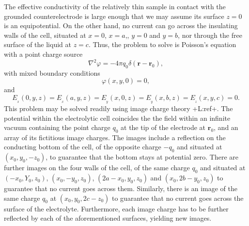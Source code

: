 \documentclass{article}
\newcommand{\notaL}[1]{{\color{blue}+L:#1+}}
\begin{document}
The effective conductivity of the relatively thin sample in contact
with the grounded counterelectrode is large enough that we may assume its
surface $z=0$ is an equipotential.
On the other hand, no current can go across the insulating walls of
the cell, situated at $x=0$, $x=a$,, $y=0$ and $y=b$, nor through the
free surface of the liquid at $z=c$. Thus, the problem to solve is Poisson's
equation with a point charge source
\begin{equation}
  \label{eq:poisson}
  \nabla^2\varphi=-4\pi q_0\delta(\bm r-\bm r_0),
\end{equation}
with mixed boundary conditions
\begin{equation}
  \label{eq:ground}
  \varphi(x,y,0)=0,
\end{equation}
and
\begin{equation}
E_{_{x}}(0, y ,z)= E_{_{x}}(a, y ,z)=E_{{_y}}(x, 0 ,z)=E_{{_y}}(x, b
,z)=E_{{_z}}(x, y ,c)=0.
\end{equation}
This problem may be solved readily using image charge theory
\notaL{ref}. The potential within the electrolytic cell coincides the
the field within an infinite vacuum containing the point charge
$q_0$ at the tip of the electrode at $\bm r_0$, and an array of its fictitious image
charges. The images include a reflection on the conducting bottom of the
cell, of the opposite charge $-q_0$ and situated at $(x_0, y_0,-z_0)$,
to guarantee that the bottom stays at potential zero.
There are further images on the four walls of the cell, of the same charge $q_0$
and situated at $(-x_0,Y_0,z_0)$, $(x_0,-y_0, z_0)$, $(2a-x_0, y_0,
z_0)$ and $(x_0, 2b-y_0,z_0)$ to guarantee that no current goes across
them. Similarly, there is an image of the same charge $q_0$ at
$(x_0,y_0,2c-z_0)$ to guarantee that no current goes across the
surface of the electrolyte. Furthermore, each image charge has to be
further reflected by each of the aforementioned surfaces, yielding new
images.
\end{document}
